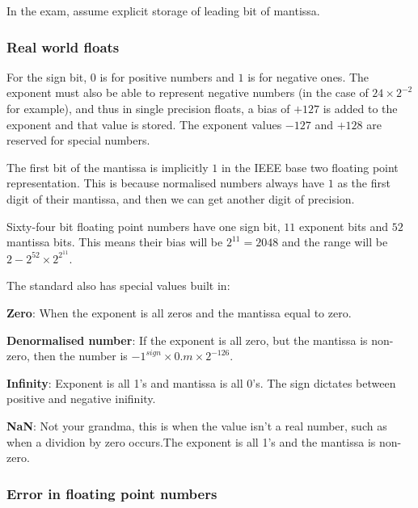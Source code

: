 
In the exam, assume explicit storage of leading bit of mantissa.

\subsubsection{Real world floats}


For the sign bit, $0$ is for positive numbers and $1$ is for negative ones. The
exponent must also be able to represent negative numbers (in the case of
$24\times2^{-2}$ for example), and thus in single precision floats, a bias of
$+127$ is added to the exponent and that value is stored. The exponent values
$-127$ and $+128$ are reserved for special numbers.

The first bit of the mantissa is implicitly $1$ in the IEEE base two floating
point representation. This is because normalised numbers always have $1$ as the
first digit of their mantissa, and then we can get another digit of precision.


Sixty-four bit floating point numbers have one sign bit, $11$ exponent bits and
$52$ mantissa bits. This means their bias will be $2^11 = 2048$ and the range
will be $2 - 2^{52} \times 2^{2^{11}}$.

The standard also has special values built in:

\begin{description}
  \item \textbf{Zero}: When the exponent is all zeros and the mantissa equal to 
  zero.
  \item \textbf{Denormalised number}: If the exponent is all zero, but the
  mantissa is non-zero, then the number is
  $-1^{sign} \times 0.m\times 2^{-126}$.
  \item \textbf{Infinity}: Exponent is all 1's and mantissa is all 0's. The
  sign dictates between positive and negative inifinity.
  \item \textbf{NaN}: Not your grandma, this is when the value isn't a real
  number, such as when a dividion by zero occurs.The exponent is all 1's and
  the mantissa is non-zero.
\end{description}


\subsubsection{Error in floating point numbers}

